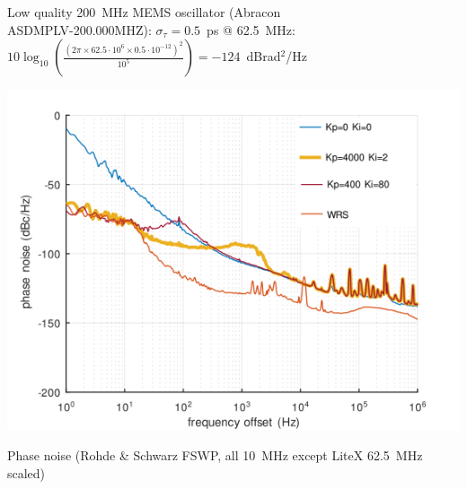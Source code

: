 \documentclass[compress,10pt,aspectratio=169]{beamer}
\begin{document}
\begin{frame}[fragile]
\begin{minipage}[t]{1.06\linewidth}
\begin{minipage}{.49\linewidth}
{{\footnotesize Low quality 200~MHz MEMS oscillator (Abracon \\ASDMPLV-200.000MHZ): $\sigma_\tau=0.5$~ps @ 62.5~MHz:\\
$10\log_{10}\left(\frac{(2\pi\times 62.5\cdot 10^6\times 0.5\cdot 10^{-12})^2}{10^5}\right)=-124$~dBrad$^2$/Hz\par
\par}
}
\end{minipage}
\begin{minipage}{.49\linewidth}
\includegraphics[width=\linewidth]{phase_noise_litex.png}

Phase noise (Rohde \& Schwarz FSWP, all 10~MHz except LiteX 62.5~MHz
scaled)
\end{minipage}
\end{minipage}


\end{frame}
\end{document}
